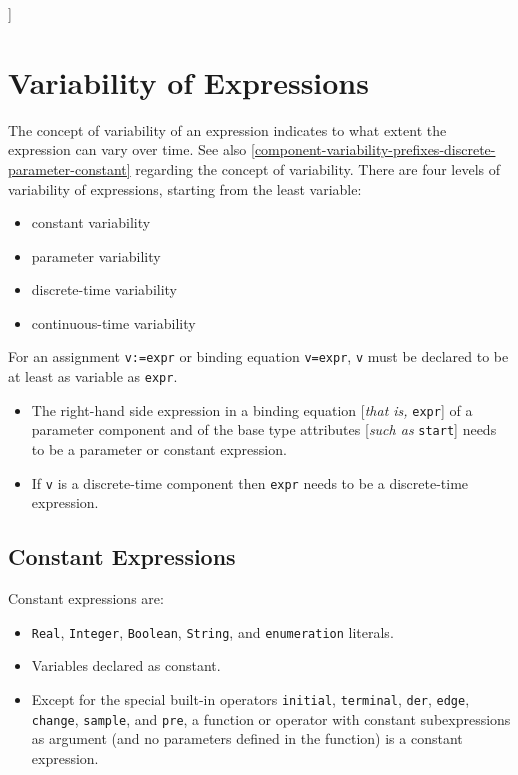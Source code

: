 {]}

\section{Variability of Expressions}

The concept of variability of an expression indicates to what extent the
expression can vary over time. See also \autoref{component-variability-prefixes-discrete-parameter-constant} regarding the
concept of variability. There are four levels of variability of
expressions, starting from the least variable:

\begin{itemize}
\item
  constant variability
\item
  parameter variability
\item
  discrete-time variability
\item
  continuous-time variability
\end{itemize}

For an assignment \lstinline!v:=expr! or binding equation \lstinline!v=expr!, \lstinline!v! must be declared
to be at least as variable as \lstinline!expr!.

\begin{itemize}
\item
  The right-hand side expression in a binding equation {[}\emph{that is,}
  \lstinline!expr!{]} of a parameter component and of the base type attributes
  {[}\emph{such as} \lstinline!start!{]} needs to be a parameter or constant
  expression.
\item
  If \lstinline!v! is a discrete-time component then \lstinline!expr! needs to be a
  discrete-time expression.
\end{itemize}

\subsection{Constant Expressions}

Constant expressions are:

\begin{itemize}
\item
  \lstinline!Real!, \lstinline!Integer!, \lstinline!Boolean!, \lstinline!String!, and \lstinline!enumeration! literals.
\item
  Variables declared as constant.
\item
  Except for the special built-in operators \lstinline!initial!, \lstinline!terminal!, \lstinline!der!,
  \lstinline!edge!, \lstinline!change!, \lstinline!sample!, and \lstinline!pre!, a function or operator with constant
  subexpressions as argument (and no parameters defined in the function)
  is a constant expression.
\end{itemize}

